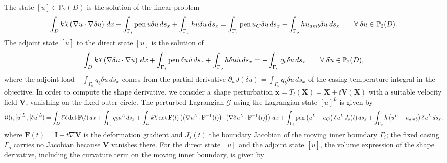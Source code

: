 \documentclass[preview]{standalone}
\let\oldcdot\cdot
\let\cdot\oldcdot
\begin{document}
The state $\left[ u\right] \in \mathbb P_{2}(D)$ is the solution of the linear problem
\begin{dmath*}
\int_{D} k \raisebox{\depth}{$\chi$} \left(  \nabla u  \cdot  \nabla \delta u  \right) \,dx + \int_{\Gamma_i} \operatorname{pen} u \delta u \,ds_x + \int_{\Gamma_o} h u \delta u \,ds_x = \int_{\Gamma_i} \operatorname{pen} u_{C} \delta u \,ds_x + \int_{\Gamma_o} h u_{amb} \delta u \,ds_x \qquad \forall\; {\delta u\in \mathbb P_{2}(D)} .
\end{dmath*}
The adjoint state $\left[ \tilde u\right]$ to the direct state $\left[ u\right]$ is the solution of
\begin{dmath*}
\int_{D} k \raisebox{\depth}{$\chi$} \left(  \nabla \delta u  \cdot  \nabla \tilde u  \right) \,dx + \int_{\Gamma_i} \operatorname{pen} \delta u \tilde u \,ds_x + \int_{\Gamma_o} h \delta u \tilde u \,ds_x = - \int_{\Gamma_o} q_b \delta u \,ds_x \qquad \forall\; {\delta u\in \mathbb P_{2}(D)} ,
\end{dmath*}
where the adjoint load $- \int_{\Gamma_o} q_b \delta u \,ds_x$ comes from the partial derivative $\partial_{u} J(\delta u) = \int_{\Gamma_o} q_b \delta u \,ds_x$ of the casing temperature integral in the objective.
In order to compute the shape derivative, we consider a shape perturbation $\mathbf x = T_t(\mathbf X) = \mathbf X + t \mathbf  V(\mathbf X)$ with a suitable velocity field $\mathbf V$, vanishing on the fixed outer circle.  The perturbed Lagrangian $\mathcal G$ using the Lagrangian state $\left[ u\right]^{L}$ is given by
\begin{dmath*}
\mathcal G(t,\left[ u\right]^{L},\left[ \delta u\right]^{L}) = \int_{D} \ell \raisebox{\depth}{$\chi$}  \operatorname{det}\mathbf F( t )  \,dx + \int_{\Gamma_o} q_b u^{L} \,ds_x +  \int_{D} k \raisebox{\depth}{$\chi$}  \operatorname{det}\mathbf F( t )  \left( \left(  \nabla u^{L} \cdot  \mathbf F^{-1}(t) \right) \cdot \left(  \nabla \delta u^{L} \cdot  \mathbf F^{-1}(t) \right) \right) \,dx + \int_{\Gamma_i} \operatorname{pen} \left( u^{L} - u_{C}\right) \delta u^{L} \,J_{s}(t) \,ds_x + \int_{\Gamma_o} h \left( u^{L} - u_{amb}\right) \delta u^{L} \,ds_x ,
\end{dmath*}
where $\mathbf F(t) = \mathbf I + t \nabla \mathbf V$ is the deformation gradient and $J_{s}(t)$ the boundary Jacobian of the moving inner boundary $\Gamma_i$; the fixed casing $\Gamma_o$ carries no Jacobian because $\mathbf V$ vanishes there.
For the direct state $\left[ u\right]$ and the adjoint state $\left[ \tilde u\right]$, the volume expression of the shape derivative, including the curvature term on the moving inner boundary, is given by
\end{document}

